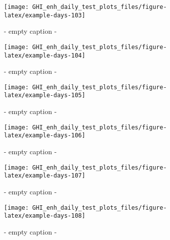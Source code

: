 \documentclass[
  10pt,
  a4paper,oneside]{article}
\begin{document}
\begin{figure}[H]

{\centering \texttt{[image: GHI\_enh\_daily\_test\_plots\_files/figure-latex/example-days-103]} 

}

\caption{ - empty caption - }\label{fig:example-days-103}
\end{figure}

\begin{figure}[H]

{\centering \texttt{[image: GHI\_enh\_daily\_test\_plots\_files/figure-latex/example-days-104]} 

}

\caption{ - empty caption - }\label{fig:example-days-104}
\end{figure}

\begin{figure}[H]

{\centering \texttt{[image: GHI\_enh\_daily\_test\_plots\_files/figure-latex/example-days-105]} 

}

\caption{ - empty caption - }\label{fig:example-days-105}
\end{figure}

\begin{figure}[H]

{\centering \texttt{[image: GHI\_enh\_daily\_test\_plots\_files/figure-latex/example-days-106]} 

}

\caption{ - empty caption - }\label{fig:example-days-106}
\end{figure}

\begin{figure}[H]

{\centering \texttt{[image: GHI\_enh\_daily\_test\_plots\_files/figure-latex/example-days-107]} 

}

\caption{ - empty caption - }\label{fig:example-days-107}
\end{figure}

\begin{figure}[H]

{\centering \texttt{[image: GHI\_enh\_daily\_test\_plots\_files/figure-latex/example-days-108]} 

}

\caption{ - empty caption - }\label{fig:example-days-108}
\end{figure}
\end{document}

